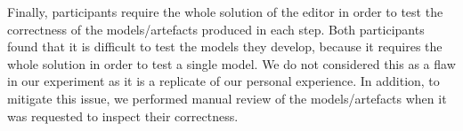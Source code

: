 Finally, participants require the whole solution of the editor in order to test the correctness of the models/artefacts produced in each step. Both participants found that it is difficult to test the models they develop, because it requires the whole solution in order to test a single model. We do not considered this as a flaw in our experiment as it is a replicate of our personal experience.
In addition, to mitigate this issue, we performed manual review of the models/artefacts when it was requested to inspect their correctness.
